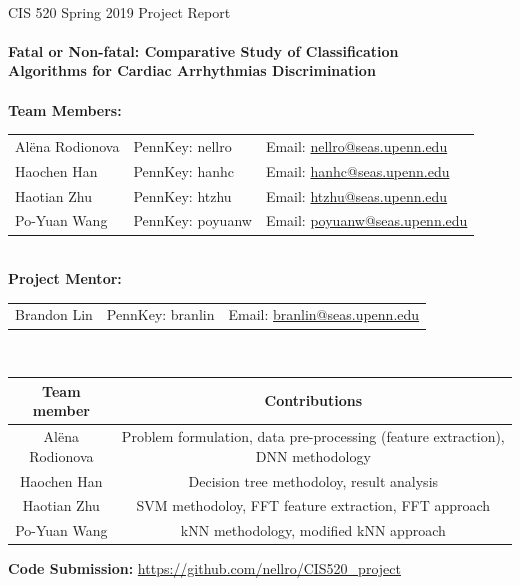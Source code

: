 \renewcommand{\headrulewidth}{0pt}
\renewcommand{\headrulewidth}{0pt}

\thispagestyle{fancy}
\mbox{}\vspace{1cm}\\
CIS 520 Spring 2019 Project Report\\
\\
{\Large \textbf{
Fatal or Non-fatal: Comparative Study of 
Classification \\Algorithms for Cardiac Arrhythmias Discrimination}} 
\\
\vspace{5cm}\\
%
%
%
\textbf{Team Members:}\\
%
\begin{tabular}{lll}%
	Al\"{e}na Rodionova & 
	PennKey: nellro &
	Email: 
	\href{mailto:nellro@seas.upenn.edu}{nellro@seas.upenn.edu} \\
	Haochen Han & 
	PennKey: hanhc& 
	Email: \href{mailto:hanhc@seas.upenn.edu}{hanhc@seas.upenn.edu}\\
	Haotian Zhu &
	PennKey: htzhu& 
	Email: \href{mailto:htzhu@seas.upenn.edu}{htzhu@seas.upenn.edu}\\
	Po-Yuan Wang & 
	PennKey: poyuanw & 
	Email:
	\href{mailto:poyuanw@seas.upenn.edu}{poyuanw@seas.upenn.edu}
\end{tabular}
%
\vspace{1cm}\\
\textbf{Project Mentor:}\\
\begin{tabular}{lll}%
	Brandon Lin & 
	PennKey: branlin &
	Email: 
	\href{mailto:branlin@seas.upenn.edu}{branlin@seas.upenn.edu} \\
\end{tabular}
\vspace{2cm}\\
\begin{table}[h!]
	\begin{center}
	\begin{tabular}{|c|c|}
		\hline
		\textbf{Team member} & \textbf{Contributions} \\ \hline
		Al\"{e}na Rodionova&   Problem formulation, data 
		pre-processing (feature extraction), DNN methodology\\ 
		\hline
		Haochen Han&    Decision tree methodoloy, result analysis \\ \hline
		Haotian Zhu&    SVM methodoloy, FFT feature extraction, FFT approach  \\ \hline
		Po-Yuan Wang&  kNN methodology, modified kNN approach  \\ \hline
	\end{tabular}
\end{center}
\end{table}


\vspace{2cm}
\textbf{Code Submission:} 
\url{https://github.com/nellro/CIS520_project}


\newpage